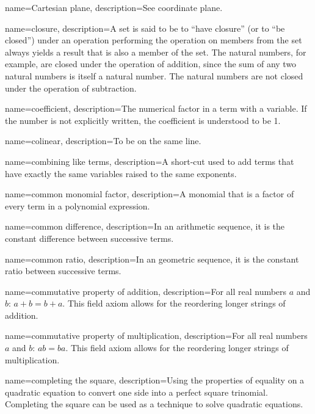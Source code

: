  {
	name=Cartesian plane,
	description={See \gls{coordinate plane}.}
}

 {
	name=closure,
	description={A set is said to be to ``have closure'' (or to ``be closed'') under an operation performing the operation on members from the set always yields a result that is also a member of the set. The \glspl{natural number}, for example, are closed under the operation of addition, since the sum of any two natural numbers is itself a natural number. The natural numbers are not closed under the operation of subtraction.}
}

 {
	name=coefficient,
	description={The numerical factor in a term with a variable. If the number is not explicitly written, the coefficient is understood to be 1.}
}

 {
	name=colinear,
	description={To be on the same line.}
}

 {
	name=combining like terms,
	description={A short-cut used to add terms that have exactly the same variables raised to the same exponents.}
}

 {
	name=common monomial factor,
	description={A monomial that is a factor of every term in a polynomial expression.}
}

 {
	name=common difference,
	description={In an arithmetic sequence, it is the constant difference between successive terms.}
}

 {
	name=common ratio,
	description={In an geometric sequence, it is the constant ratio between successive terms.}
}

 {
	name=commutative property of addition,
	description={For all real numbers $a$ and $b$: $a + b = b + a$. This field axiom allows for the reordering longer strings of addition. }
}

 {
	name=commutative property of multiplication,
	description={For all real numbers $a$ and $b$: $a b = b a$. This field axiom allows for the reordering longer strings of multiplication. }
}

 {
	name=completing the square,
	description={Using the properties of equality on a quadratic equation to convert one side into a perfect square trinomial. Completing the square can be used as a 
technique to solve quadratic equations.}
}

